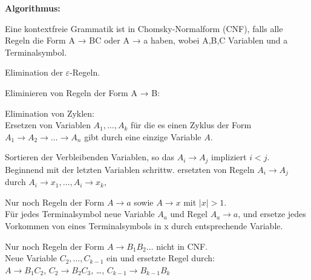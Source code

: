 \documentclass[11pt,
			a4paper,
			parskip=full,
			toc=bib,
			toc=idx,
			toc=listof,
			ngerman
			listof=totoc,]{scrartcl}
\newcommand{\concept}[1]{%
	\sf{%
		\textbf{%
				\textcolor{mymauve}{#1}%
		}%
	}%
	\rm%
}
\newenvironment{algo}[1]%
{	\begin{framed}
	\textbf{Algorithmus:} \concept{#1}}%
{\end{framed}}
\newcommand{\compress}{\vspace{-1em}}
\begin{document}
\compress
\begin{algo}{Chomsky Normalform} 

\compress
Eine kontextfreie Grammatik ist in Chomsky-Normalform (CNF), falls alle Regeln die Form 
A → BC oder A → a haben, wobei A,B,C Variablen und a Terminalsymbol.

\compress
\begin{compactenum}
  \item Elimination der $ε$-Regeln.
  \item Eliminieren von Regeln der Form A → B:
  \begin{compactenum}
    \item Elimination von Zyklen:\\
		Ersetzen von Variablen $A_1,\dots,A_k$ 
          für die es einen Zyklus der Form $A_1 → A_2 →\dots→ A_n$ gibt durch eine einzige Variable $A$.
    \item Sortieren der Verbleibenden Variablen, so das $A_i → A_j$ impliziert $i<j$. \\
          Beginnend mit der letzten Variablen schrittw. ersetzten von Regeln $A_i → A_j$
          durch $A_i → x_1, \dots, A_i → x_k$,
  \end{compactenum}  
  \item Nur noch Regeln der Form $A → a$ sowie $A → x$ mit $|x|>1$.\\
        Für jedes Terminalsymbol neue Variable $A_a$ und Regel $A_a → a$,
        und ersetze jedes Vorkommen von eines Terminalsymbols in x durch entsprechende Variable.
  \item Nur noch Regeln der Form $A → B_1B_2 \dots$ nicht in CNF. \\
        Neue Variable $C_2,\dots,C_{k-1}$ ein und ersetzte Regel durch: \\ 
	   $A → B_1C_2$, $C_2 → B_2C_3$, \dots , $C_{k-1} → B_{k-1}B_{k}$
\end{compactenum}  
\end{algo}
\end{document}
